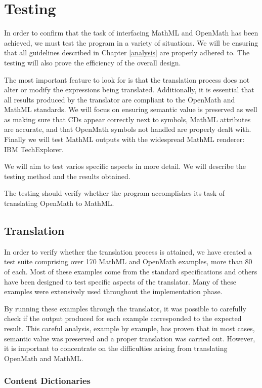 \chapter{Testing}

In order to confirm that the task of interfacing MathML and OpenMath has
been achieved, we must test the program in a variety of situations. We
will be ensuring that all guidelines described in Chapter \ref{analysis}
are properly adhered to. The testing will also prove the efficiency of
the overall design.

The most important feature to look for is that the translation process does not alter or modify the expressions being translated. Additionally, it
is essential that all results produced by the translator are compliant to the OpenMath and MathML standards. We will focus on ensuring semantic
value is preserved as well as making sure that CDs appear correctly next to symbols, MathML attributes are accurate, and that OpenMath symbols not
handled are properly dealt with. Finally we will test MathML outputs with the widespread MathML renderer: IBM TechExplorer.

We will aim to test varios specific aspects in more detail. We will describe the testing method and the results obtained.

The testing should verify whether the program accomplishes its task of translating OpenMath to MathML.

\section{Translation}

In order to verify whether the translation process is attained, we have
created a test suite comprising over 170 MathML and OpenMath examples,
more than 80 of each. Most of these examples come from the standard
specifications and others have been designed to test specific aspects
of the translator. Many of these examples were extensively used
throughout the implementation phase.

By running these examples through the translator, it was possible to
carefully check if the output produced for each example corresponded to
the expected result. This careful analysis, example by example,
has proven that in most cases, semantic value was preserved and a
proper translation was carried out.  However, it is important to
concentrate on the difficulties arising from translating OpenMath and
MathML.

\subsection{Content Dictionaries}

